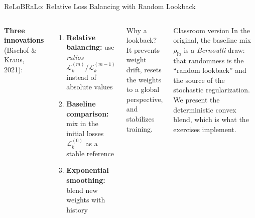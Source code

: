 \documentclass[aspectratio=169,11pt]{beamer}
\newcommand{\emphc}[1]{\textcolor{harvardcrimson}{#1}}
\begin{document}
\begin{frame}{ReLoBRaLo: Relative Loss Balancing with Random Lookback}
\begin{columns}[T]
\textbf{Three innovations} (Bischof \& Kraus, 2021):

\vspace{0.2cm}
\begin{enumerate}\itemsep4pt
    \item \textbf{Relative balancing:} use \emph{ratios} $\mathcal{L}_k^{(m)} / \mathcal{L}_k^{(m-1)}$ instead of absolute values
    \item \textbf{Baseline comparison:} mix in the \emphc{initial losses} $\mathcal{L}_k^{(0)}$ as a stable reference
    \item \textbf{Exponential smoothing:} blend new weights with history
\end{enumerate}

\begin{block}{Why a lookback?}
\footnotesize
It prevents weight drift, resets the weights to a global perspective, and stabilizes training.
\end{block}

\vspace{0.2cm}
\begin{alertblock}{Classroom version}
\footnotesize
In the original, the baseline mix $\rho_{\mathrm{lb}}$ is a \emph{Bernoulli} draw: that randomness is the ``random lookback'' and the source of the stochastic regularization. We present the \emphc{deterministic} convex blend, which is what the exercises implement.
\end{alertblock}
\end{columns}
\end{frame}
\end{document}
